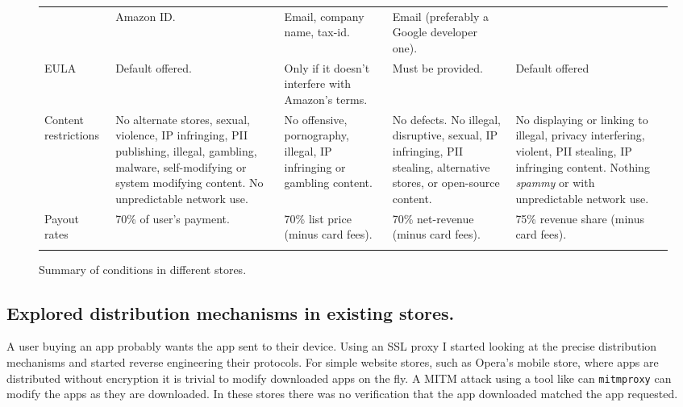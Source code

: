 \documentclass[a4paper]{scrartcl}
\begin{document}
\begin{figure}[!h]
\begin{tabulary}{\linewidth}{lLLLL}
                     & Amazon ID.
                     & Email, company name, tax-id.
                     & Email (preferably a Google developer one).                                                                                                                        \\ \addlinespace
EULA                 & Default offered.
                     & Only if it doesn't interfere with Amazon's terms.
                     & Must be provided.
                     & Default offered                                                                                                                                                   \\ \addlinespace
Content restrictions & No alternate stores, sexual, violence, IP infringing, PII publishing, illegal, gambling, malware, self-modifying or system modifying content.  No unpredictable network use.
                     & No offensive, pornography, illegal, IP infringing or gambling content.
                     & No defects. No illegal, disruptive, sexual, IP infringing, PII stealing, alternative stores, or open-source content.
                     & No displaying or linking to illegal, privacy interfering, violent, PII stealing, IP infringing content.  Nothing \emph{spammy} or with unpredictable network use. \\ \addlinespace
Payout rates         & 70\% of user's payment.
                     & 70\% list price (minus card fees).
                     & 70\% net-revenue (minus card fees).
                     & 75\% revenue share (minus card fees).                                                                                                                             \\ \addlinespace
\bottomrule
\end{tabulary}
\caption{Summary of conditions in different stores.}
\label{tab:terms}
\end{figure}

\subsection{Explored distribution mechanisms in existing stores.}

A user buying an app probably wants the app sent to their device.
Using an SSL proxy I started looking at the precise distribution mechanisms and started reverse engineering their protocols.
For simple website stores, such as Opera's mobile store, where apps are distributed without encryption it is trivial to modify downloaded apps on the fly.
A \ac{MITM} attack using a tool like can \texttt{mitmproxy} can modify the apps as they are downloaded.
In these stores there was no verification that the app downloaded matched the app requested.
\end{document}
